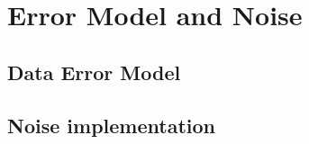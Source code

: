 \section{Error Model and Noise}\label{sct:cortomo_errmod}
\subsection{Data Error Model}\label{sct:cortomo_data_errmod}
\subsection{Noise implementation}\label{sct:cortomo_noise_errmod}
